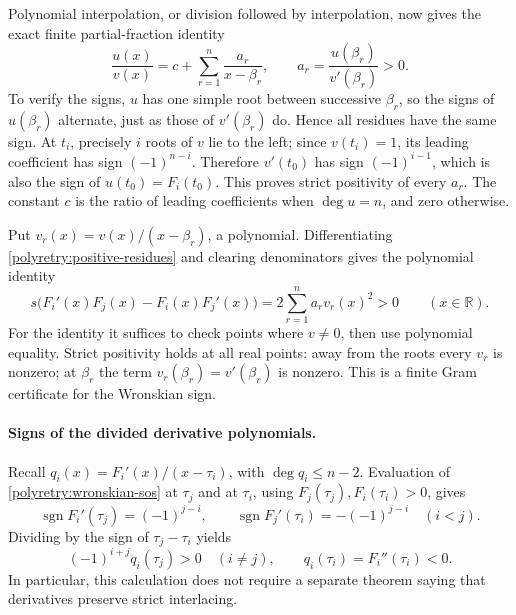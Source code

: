 \documentclass[11pt]{article}
\newcommand{\R}{\mathbb R}
\theoremstyle{remark}\newtheorem{remark}[theorem]{Remark}
\begin{document}
Polynomial interpolation, or division followed by interpolation,
now gives the exact finite partial-fraction identity
\begin{equation}\label{polyretry:positive-residues}
 \frac{u(x)}{v(x)}
   =c+\sum_{r=1}^n\frac{a_r}{x-\beta_r},
 \qquad a_r=\frac{u(\beta_r)}{v'(\beta_r)}>0.
\end{equation}
To verify the signs, $u$ has one simple root between successive
$\beta_r$, so the signs of $u(\beta_r)$ alternate, just as those
of $v'(\beta_r)$ do.  Hence all residues have the same sign.
At $t_i$, precisely $i$ roots of $v$ lie to the left; since
$v(t_i)=1$, its leading coefficient has sign $(-1)^{n-i}$.
Therefore $v'(t_0)$ has sign $(-1)^{i-1}$, which is also the
sign of $u(t_0)=F_i(t_0)$.  This proves strict positivity of
every $a_r$.  The constant $c$ is the ratio of leading
coefficients when $\deg u=n$, and zero otherwise.

Put $v_r(x)=v(x)/(x-\beta_r)$, a polynomial.  Differentiating
\eqref{polyretry:positive-residues} and clearing denominators
gives the polynomial identity
\begin{equation}\label{polyretry:wronskian-sos}
 s\bigl(F_i'(x)F_j(x)-F_i(x)F_j'(x)\bigr)
       =2\sum_{r=1}^n a_r v_r(x)^2>0
       \qquad(x\in\R).
\end{equation}
For the identity it suffices to check points where $v\ne0$,
then use polynomial equality.  Strict positivity holds at all
real points: away from the roots every $v_r$ is nonzero; at
$\beta_r$ the term $v_r(\beta_r)=v'(\beta_r)$ is nonzero.
This is a finite Gram certificate for the Wronskian sign.

\paragraph{Signs of the divided derivative polynomials.}
Recall $q_i(x)=F_i'(x)/(x-\tau_i)$, with $\deg q_i\le n-2$.
Evaluation of \eqref{polyretry:wronskian-sos} at $\tau_j$
and at $\tau_i$, using $F_j(\tau_j),F_i(\tau_i)>0$, gives
\[
 \operatorname{sgn}F_i'(\tau_j)=(-1)^{j-i},\qquad
 \operatorname{sgn}F_j'(\tau_i)=-(-1)^{j-i}
       \quad(i<j).
\]
Dividing by the sign of $\tau_j-\tau_i$ yields
\begin{equation}\label{polyretry:q-signs}
 (-1)^{i+j}q_i(\tau_j)>0\quad(i\ne j),
 \qquad q_i(\tau_i)=F_i''(\tau_i)<0.
\end{equation}
In particular, this calculation does not require a separate
theorem saying that derivatives preserve strict interlacing.
\end{document}
